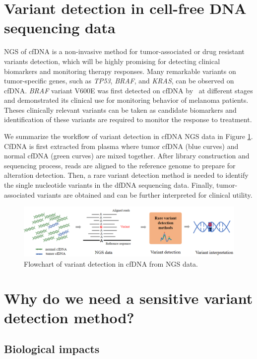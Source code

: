 \documentclass[a4,center,fleqn]{NAR}
\begin{document}
\section{Variant detection in cell-free DNA sequencing data}

NGS of cfDNA is a non-invasive method for tumor-associated or drug resistant variants detection, which will be highly promising for detecting clinical biomarkers and monitoring therapy responses. 
Many remarkable variants on tumor-specific genes, such as \textit{TP53}, \textit{BRAF}, and \textit{KRAS}, can be observed on cfDNA.
\textit{BRAF} variant V600E was first detected on cfDNA by~\citep{shinozaki2007utility} at different stages and demonstrated its clinical use for monitoring behavior of melanoma patients.
Theses clinically relevant variants can be taken as candidate biomarkers and identification of these variants are required to monitor the response to treatment.

\clearpage

We summarize the workflow of variant detection in cfDNA NGS data in Figure \ref{fig:flowchart}.
CfDNA is first extracted from plasma where tumor cfDNA (blue curves) and normal cfDNA (green curves) are mixed together.
After library construction and sequencing process, reads are aligned to the reference genome to prepare for alteration detection.
Then, a rare variant detection method is needed to identify the single nucleotide variants in the dfDNA sequencing data.
Finally, tumor-associated variants are obtained and can be further interpreted for clinical utility.


\begin{figure}[ht]
\centering
\includegraphics[width=1\textwidth]{flowchart.png}
\caption{Flowchart of variant detection in cfDNA from NGS data.}
\label{fig:flowchart}
\end{figure}


\section{Why do we need a sensitive variant detection method?}

\subsection{Biological impacts}
\end{document}
